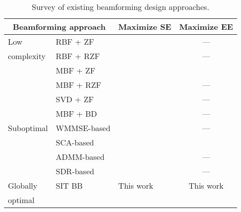\documentclass[a4paper,10pt,journal]{IEEEtran}
\begin{document}
\begin{table}
\caption{Survey of existing   beamforming design approaches.}
	\label{tab:algosurvey}
	\centering
	\footnotesize
	\begin{tabularx}{\linewidth}{@{ }ll@{\enskip}Xc@{ }}
		\toprule
		\multicolumn{2}{c}{Beamforming approach}
		& Maximize SE
		& Maximize EE
		\\
		\midrule
		Low
		& RBF + ZF
		& \cite{RS2015bruno,enrico2016bruno,onur2021mobility}
		& ---
		\\
		complexity
		& RBF + RZF
		& \cite{Lu2018MMSERS}
		& ---
		\\ 
		& MBF + ZF
		& \cite{bruno2019wcl}
		& \cite{Gui2020EESEtradeoff}
		\\ 
		& MBF + RZF
		& \cite{Lu2018MMSERS,Minbo2016MassiveMIMO,AP2017bruno,Asos2018MultiRelay}
		& ---
		\\ 
		& SVD + ZF
		& \cite{hamdi2016tcom}
		& ---
		\\ 
		& MBF + BD
		& \cite{bruno2020MUMIMO}
		& ---
		\\
		\midrule
		Suboptimal
		& WMMSE-based
	& \cite{hamdi2016tcom,mao2017eurasip,alaa2020cranimperfectCSIT,mao2021IoT,mao2019TCOM}
		& ---
		\\ 
		& SCA-based
		& \cite{mao2019maxmin, Zheng2020JSAC,mao2019TCOM,Gui2020EESEtradeoff,fuhao2020secrecyRS,wonjae2021imperfectCSIR}
		& \cite{mao2018EE,alaa2020EECRAN,Jia2020SEEEtradeoff}         \\ 
		& ADMM-based
		& \cite{xu2021rate,onur2021DAC,rafael2021radarsensing}
		& ---
		\\ 
		& SDR-based
		& \cite{fuhao2020secrecyRS,wonjae2021imperfectCSIR}
		& ---
		\\
		\midrule
		Globally
		& SIT BB
		& This work
		& This work
		\\
		optimal
		\\
		\bottomrule
	\end{tabularx}
\end{table}
\end{document}
